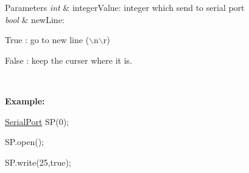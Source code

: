 \begin{DoxyParams}{Parameters}
{\em int} & integerValue: integer which send to serial port \\
\hline
{\em bool} & newLine:
\begin{DoxyItemize}
\item True : go to new line ($\backslash$n$\backslash$r)
\item False : keep the curser where it is. \par

\end{DoxyItemize}\\
\hline
\end{DoxyParams}
{\bfseries Example:}\par


\hyperlink{class_serial_port}{SerialPort} SP(0); \par
 SP.open(); \par
 SP.write(25,true);\par
 